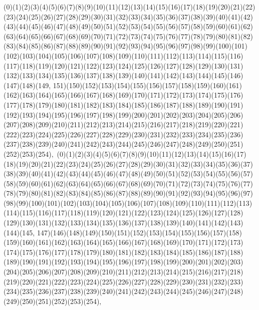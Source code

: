 \documentclass[12pt]{article}
\begin{document}
{(0)(1)(2)(3)(4)(5)(6)(7)(8)(9)(10)(11)(12)(13)(14)(15)(16)(17)(18)(19)(20)(21)(22)(23)(24)(25)(26)(27)(28)(29)(30)(31)(32)(33)(34)(35)(36)(37)(38)(39)(40)(41)(42)(43)(44)(45)(46)(47)(48)(49)(50)(51)(52)(53)(54)(55)(56)(57)(58)(59)(60)(61)(62)(63)(64)(65)(66)(67)(68)(69)(70)(71)(72)(73)(74)(75)(76)(77)(78)(79)(80)(81)(82)(83)(84)(85)(86)(87)(88)(89)(90)(91)(92)(93)(94)(95)(96)(97)(98)(99)(100)(101)(102)(103)(104)(105)(106)(107)(108)(109)(110)(111)(112)(113)(114)(115)(116)(117)(118)(119)(120)(121)(122)(123)(124)(125)(126)(127)(128)(129)(130)(131)(132)(133)(134)(135)(136)(137)(138)(139)(140)(141)(142)(143)(144)(145)(146)(147)(148)(149, 151)(150)(152)(153)(154)(155)(156)(157)(158)(159)(160)(161)(162)(163)(164)(165)(166)(167)(168)(169)(170)(171)(172)(173)(174)(175)(176)(177)(178)(179)(180)(181)(182)(183)(184)(185)(186)(187)(188)(189)(190)(191)(192)(193)(194)(195)(196)(197)(198)(199)(200)(201)(202)(203)(204)(205)(206)(207)(208)(209)(210)(211)(212)(213)(214)(215)(216)(217)(218)(219)(220)(221)(222)(223)(224)(225)(226)(227)(228)(229)(230)(231)(232)(233)(234)(235)(236)(237)(238)(239)(240)(241)(242)(243)(244)(245)(246)(247)(248)(249)(250)(251)(252)(253)(254)$
, 
$
(0)(1)(2)(3)(4)(5)(6)(7)(8)(9)(10)(11)(12)(13)(14)(15)(16)(17)(18)(19)(20)(21)(22)(23)(24)(25)(26)(27)(28)(29)(30)(31)(32)(33)(34)(35)(36)(37)(38)(39)(40)(41)(42)(43)(44)(45)(46)(47)(48)(49)(50)(51)(52)(53)(54)(55)(56)(57)(58)(59)(60)(61)(62)(63)(64)(65)(66)(67)(68)(69)(70)(71)(72)(73)(74)(75)(76)(77)(78)(79)(80)(81)(82)(83)(84)(85)(86)(87)(88)(89)(90)(91)(92)(93)(94)(95)(96)(97)(98)(99)(100)(101)(102)(103)(104)(105)(106)(107)(108)(109)(110)(111)(112)(113)(114)(115)(116)(117)(118)(119)(120)(121)(122)(123)(124)(125)(126)(127)(128)(129)(130)(131)(132)(133)(134)(135)(136)(137)(138)(139)(140)(141)(142)(143)(144)(145, 147)(146)(148)(149)(150)(151)(152)(153)(154)(155)(156)(157)(158)(159)(160)(161)(162)(163)(164)(165)(166)(167)(168)(169)(170)(171)(172)(173)(174)(175)(176)(177)(178)(179)(180)(181)(182)(183)(184)(185)(186)(187)(188)(189)(190)(191)(192)(193)(194)(195)(196)(197)(198)(199)(200)(201)(202)(203)(204)(205)(206)(207)(208)(209)(210)(211)(212)(213)(214)(215)(216)(217)(218)(219)(220)(221)(222)(223)(224)(225)(226)(227)(228)(229)(230)(231)(232)(233)(234)(235)(236)(237)(238)(239)(240)(241)(242)(243)(244)(245)(246)(247)(248)(249)(250)(251)(252)(253)(254)$
, 
$
}
\end{document}
